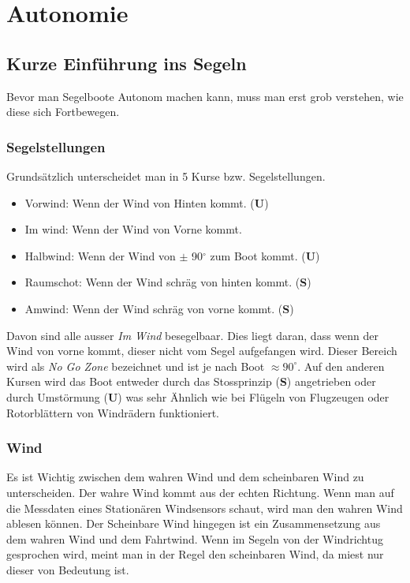 
\chapter{Autonomie}
\label{chap:autonomie}


\section{Kurze Einführung ins Segeln}
Bevor man Segelboote Autonom machen kann, muss man erst grob verstehen, wie diese sich Fortbewegen. 
\subsection{Segelstellungen}
Grundsätzlich unterscheidet man in 5 Kurse bzw. Segelstellungen.
\begin{itemize}
    \item Vorwind: Wenn der Wind von Hinten kommt. (\textbf{U})
    \item Im wind: Wenn der Wind von Vorne kommt.
    \item Halbwind: Wenn der Wind von $\pm$ 90$^{\circ}$ zum Boot kommt. (\textbf{U})
    \item Raumschot: Wenn der Wind schräg von hinten kommt. (\textbf{S})
    \item Amwind: Wenn der Wind schräg von vorne kommt. (\textbf{S})
\end{itemize}
Davon sind alle ausser \textit{Im Wind} besegelbaar. Dies liegt daran, dass wenn der Wind von vorne kommt, dieser nicht vom Segel aufgefangen wird. Dieser Bereich wird als \textit{No Go Zone} bezeichnet und ist je nach Boot $\approx 90^{\circ}$. Auf den anderen Kursen wird das Boot entweder durch das Stossprinzip (\textbf{S}) angetrieben oder durch Umstörmung (\textbf{U}) was sehr Ähnlich wie bei Flügeln von Flugzeugen oder Rotorblättern von Windrädern funktioniert.  
\subsection{Wind}
Es ist Wichtig zwischen dem wahren Wind und dem scheinbaren Wind zu unterscheiden. Der wahre Wind kommt aus der echten Richtung. Wenn man auf die Messdaten eines Stationären Windsensors schaut, wird man den wahren Wind ablesen können. Der Scheinbare Wind hingegen ist ein Zusammensetzung aus dem wahren Wind und dem Fahrtwind. Wenn im Segeln von der Windrichtug gesprochen wird, meint man in der Regel den scheinbaren Wind, da miest nur dieser von Bedeutung ist. 

